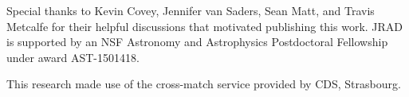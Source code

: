 \documentclass[manuscript, letterpaper]{aastex6}
\begin{document}
\acknowledgments
Special thanks to Kevin Covey, Jennifer van Saders, Sean Matt, and Travis Metcalfe for their helpful discussions that motivated publishing this work. JRAD is supported by an NSF Astronomy and Astrophysics Postdoctoral Fellowship under award AST-1501418.

This research made use of the cross-match service provided by CDS, Strasbourg.


\end{document}
